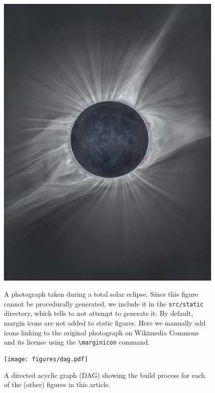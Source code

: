 \documentclass[twocolumn]{aastex631}
\begin{document}
\begin{figure}[ht!]
    \begin{centering}
        \includegraphics[width=0.75\linewidth]{static/eclipse.jpeg}
        \caption{
            A photograph taken during a total solar eclipse. 
            Since this figure cannot be procedurally generated, we include it in the \texttt{src/static} directory, which tells \showyourwork to not attempt to generate it. 
            By default, margin icons are not added to static figures.
            Here we manually add icons linking to the original photograph on Wikimedia Commons and its license using the \texttt{\textbackslash marginicon} command.
        }
        \label{fig:eclipse}
    \end{centering}
\end{figure}

\begin{figure}[ht!]
    \begin{centering}
        \texttt{[image: figures/dag.pdf]}
        \caption{
            A directed acyclic graph (DAG) showing the build process for each of the (other) figures in this article. 
        }
        \label{fig*:dag}
    \end{centering}
\end{figure}


\end{document}

